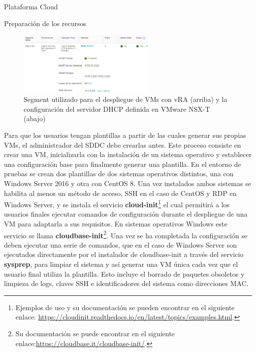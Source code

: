 \begin{subsection}{Plataforma Cloud}
\begin{subsubsection}{Preparación de los recursos}
    \begin{figure}[h]
        \centering
        \includegraphics[width=0.6\textwidth]{imaxes/pruebaconcepto/vrealize/segment-MGMT.png}
        \caption{Segment utilizado para el despliegue de VMs con vRA (arriba) y la configuración del servidor DHCP definida en VMware NSX-T (abajo)}
        \label{fig:topology-segment-mgmt}
    \end{figure}
    \FloatBarrier
    Para que los usuarios tengan plantillas a partir de las cuales generar sus propias VMs, el administrador del SDDC debe crearlas antes. Este proceso consiste en crear una VM, inicializarla con la instalación de un sistema operativo y establecer una configuración base para finalmente generar una plantilla. En el entorno de pruebas se crean dos plantillas de dos sistemas operativos distintos, una con Windows Server 2016 y otra con CentOS 8. Una vez instalados ambos sistemas se habilita al menos un método de acceso, SSH en el caso de CentOS y RDP en Windows Server, y se instala el servicio \textbf{cloud-init}\footnote{Ejemplos de uso y su documentación se pueden encontrar en el siguiente enlace: \url{https://cloudinit.readthedocs.io/en/latest/topics/examples.html}.} el cual permitirá a los usuarios finales ejecutar comandos de configuración durante el despliegue de una VM para adaptarla a sus requisitos. En sistemas operativos Windows este servicio se llama \textbf{cloudbase-init}\footnote{Su documentación se puede encontrar en el siguiente enlace:\url{https://cloudbase.it/cloudbase-init/}.}. Una vez se ha completada la configuración se deben ejecutar una serie de comandos, que en el caso de Windows Server son ejecutados directamente por el instalador de cloudbase-init a través del servicio \textbf{sysprep}, para limpiar el sistema y así generar una VM única cada vez que el usuario final utiliza la plantilla. Esto incluye el borrado de paquetes obsoletos y limpieza de logs, claves SSH e identificadores del sistema como direcciones MAC.

\end{subsubsection}
\end{subsection}
